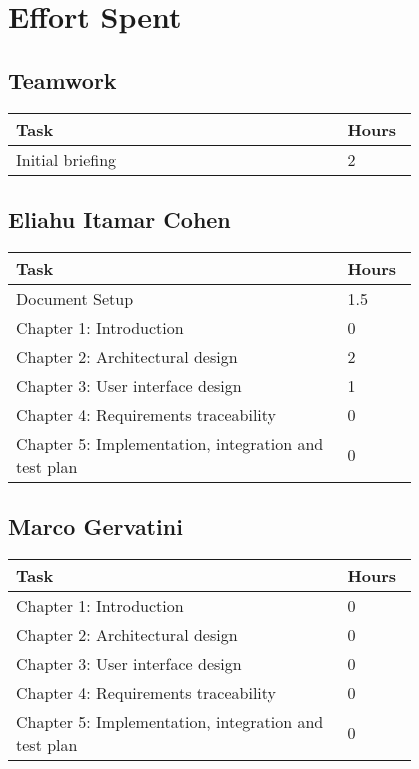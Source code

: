 \chapter{Effort Spent}
\section{Teamwork}
\begin{center}
    \begin{tabular}{@{}p{0.7\linewidth} p{0.1\linewidth}@{}}
        \hline
        \textbf{Task} & \textbf{Hours} \\ \hline
        Initial briefing & 2 \\ \hline
    \end{tabular}
\end{center}

\section{Eliahu Itamar Cohen}
\begin{center}
    \begin{tabular}{@{}p{0.7\linewidth} p{0.1\linewidth}@{}}
        \hline
        \textbf{Task} & \textbf{Hours} \\ \hline
        Document Setup & 1.5 \\ \hline
        Chapter 1: Introduction & 0 \\ \hline
        Chapter 2: Architectural design & 2 \\ \hline
        Chapter 3: User interface design & 1 \\ \hline
        Chapter 4: Requirements traceability & 0 \\ \hline
        Chapter 5: Implementation, integration and test plan & 0 \\ \hline
     
    \end{tabular}
\end{center}

\section{Marco Gervatini}
\begin{center}
	\begin{tabular}{@{}p{0.7\linewidth} p{0.1\linewidth}@{}}
		\hline
		\textbf{Task} & \textbf{Hours} \\ \hline
             Chapter 1: Introduction & 0 \\ \hline
             Chapter 2: Architectural design & 0 \\ \hline
             Chapter 3: User interface design & 0 \\ \hline
             Chapter 4: Requirements traceability & 0 \\ \hline
             Chapter 5: Implementation, integration and test plan & 0 \\ \hline
	\end{tabular}
\end{center}

